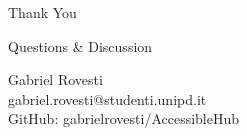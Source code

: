 \documentclass[10pt,aspectratio=169]{beamer}
\begin{document}
\begin{frame}[plain]
    \begin{center}
        \Huge Thank You
        
        \vspace{1cm}
        
        \Large Questions \& Discussion
        
        \vspace{1cm}
        
        \normalsize
        Gabriel Rovesti \\
        gabriel.rovesti@studenti.unipd.it \\
        GitHub: gabrielrovesti/AccessibleHub
    \end{center}
\end{frame}
\end{document}
